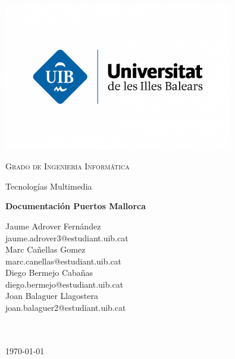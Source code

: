 \documentclass{article}
\begin{document}
\begin{titlepage}
    \centering
    \includegraphics[width=0.75\textwidth]{images/uib.png}\par\vspace{1cm}
    {\scshape\LARGE Grado de Ingeniería Informática \par}
    \vspace{1cm}
    {\Large Tecnologías Multimedia \par}
    \vspace{1.5cm}
    {\huge\bfseries Documentación Puertos Mallorca\par}
    \vspace{2cm}
    {\large
    Jaume Adrover Fernández \\
    jaume.adrover3@estudiant.uib.cat \\
    \vspace{0.5cm}
    Marc Cañellas Gomez \\
    marc.canellas@estudiant.uib.cat \\
    \vspace{0.5cm}
    Diego Bermejo Cabañas \\
    diego.bermejo@estudiant.uib.cat \\
    \vspace{0.5cm}
    Joan Balaguer Llagostera \\
    joan.balaguer2@estudiant.uib.cat \\
    \textit{}\\
    \texttt{}
    \par}
    \vfill

    {\large \texttt{} \\\today\par}
\end{titlepage}

\newpage
\hypersetup{linkcolor=black}
\tableofcontents
\newpage
\end{document}
